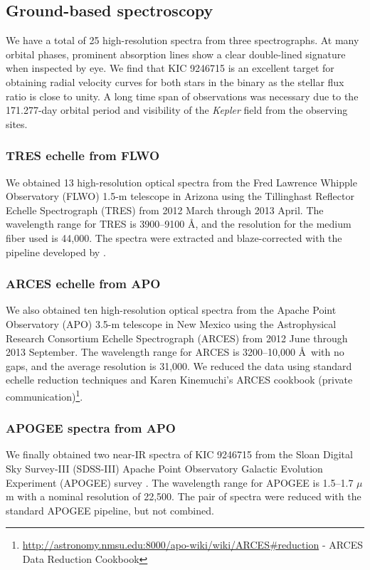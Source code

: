 \subsection{Ground-based spectroscopy}\label{spectra}
We have a total of 25 high-resolution spectra from three spectrographs. At many orbital phases, prominent absorption lines show a clear double-lined signature when inspected by eye. We find that KIC 9246715 is an excellent target for obtaining radial velocity curves for both stars in the binary as the stellar flux ratio is close to unity. A long time span of observations was necessary due to the 171.277-day orbital period and visibility of the \emph{Kepler} field from the observing sites.

\subsubsection{TRES echelle from FLWO}\label{tres}
We obtained 13 high-resolution optical spectra from the Fred Lawrence Whipple Observatory (FLWO) 1.5-m telescope in Arizona using the Tillinghast Reflector Echelle Spectrograph (TRES) from 2012 March through 2013 April. The wavelength range for TRES is 3900--9100 \AA, and the resolution for the medium fiber used is 44,000. The spectra were extracted and blaze-corrected with the pipeline developed by \citet{buc10}.

\subsubsection{ARCES echelle from APO}\label{arces}
We also obtained ten high-resolution optical spectra from the Apache Point Observatory (APO) 3.5-m telescope in New Mexico using the Astrophysical Research Consortium Echelle Spectrograph (ARCES) from 2012 June through 2013 September. The wavelength range for ARCES is 3200--10,000 \AA \ with no gaps, and the average resolution is 31,000. We reduced the data using standard echelle reduction techniques and Karen Kinemuchi's ARCES cookbook (private communication)\footnote{\url{http://astronomy.nmsu.edu:8000/apo-wiki/wiki/ARCES\#reduction} - ARCES Data Reduction Cookbook}.

\subsubsection{APOGEE spectra from APO}\label{apogee}
We finally obtained two near-IR spectra of KIC 9246715 from the Sloan Digital Sky Survey-III (SDSS-III) Apache Point Observatory Galactic Evolution Experiment (APOGEE) survey \citep{ala15}. The wavelength range for APOGEE is 1.5--1.7 $\mu$m with a nominal resolution of 22,500. The pair of spectra were reduced with the standard APOGEE pipeline, but not combined.

